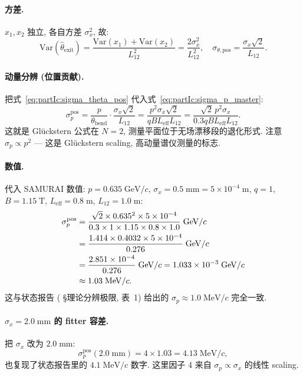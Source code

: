 \paragraph{方差.} $x_1, x_2$ 独立, 各自方差 $\sigma_x^2$, 故:
\begin{equation}
  \mathrm{Var}(\widehat\theta_\mathrm{exit}) = \frac{\mathrm{Var}(x_1) + \mathrm{Var}(x_2)}{L_{12}^2}
  = \frac{2 \sigma_x^2}{L_{12}^2},
  \quad
  \sigma_{\theta,\mathrm{pos}} = \frac{\sigma_x \sqrt 2}{L_{12}}.
  \label{eq:partIc:sigma_theta_pos}
\end{equation}

\paragraph{动量分辨 (位置贡献).} 把式~\eqref{eq:partIc:sigma_theta_pos} 代入式~\eqref{eq:partIc:sigma_p_master}:
\begin{equation}
  \sigma_p^\mathrm{pos}
  = \frac{p}{\theta_\mathrm{bend}} \cdot \frac{\sigma_x \sqrt 2}{L_{12}}
  = \frac{p^2 \sigma_x \sqrt 2}{q B L_\mathrm{eff} L_{12}}
  = \frac{\sqrt 2 \, p^2 \sigma_x}{0.3 q B L_\mathrm{eff} L_{12}}.
  \label{eq:partIc:gluckstern_2pt}
\end{equation}
这就是 Glückstern 公式在 $N=2$, 测量平面位于无场漂移段的退化形式. 注意 $\sigma_p \propto p^2$ — 这是 Glückstern scaling, 高动量谱仪测量的标志.

\paragraph{数值.} 代入 SAMURAI 数值: $p = 0.635\;\mathrm{GeV}/c$, $\sigma_x = 0.5\;\mathrm{mm} = 5 \times 10^{-4}\;\mathrm{m}$, $q = 1$, $B = 1.15\;\mathrm{T}$, $L_\mathrm{eff} = 0.8\;\mathrm{m}$, $L_{12} = 1.0\;\mathrm{m}$:
\begin{align}
  \sigma_p^\mathrm{pos}
  &= \frac{\sqrt 2 \times 0.635^2 \times 5 \times 10^{-4}}{0.3 \times 1 \times 1.15 \times 0.8 \times 1.0}\;\mathrm{GeV}/c \notag\\
  &= \frac{1.414 \times 0.4032 \times 5 \times 10^{-4}}{0.276}\;\mathrm{GeV}/c \notag\\
  &= \frac{2.851 \times 10^{-4}}{0.276}\;\mathrm{GeV}/c
  = 1.033 \times 10^{-3}\;\mathrm{GeV}/c \notag\\
  &\approx 1.03\;\mathrm{MeV}/c.
\end{align}
这与状态报告 (\StatusReport{} §理论分辨极限, 表~1) 给出的 $\sigma_p \approx 1.0\;\mathrm{MeV}/c$ 完全一致.

\paragraph{$\sigma_x = 2.0\;\mathrm{mm}$ 的 fitter 容差.} 把 $\sigma_x$ 改为 $2.0\;\mathrm{mm}$:
\begin{equation}
  \sigma_p^\mathrm{pos}(2.0\;\mathrm{mm})
  = 4 \times 1.03 = 4.13\;\mathrm{MeV}/c,
\end{equation}
也复现了状态报告里的 $4.1\;\mathrm{MeV}/c$ 数字. 这里因子 4 来自 $\sigma_p \propto \sigma_x$ 的线性 scaling.

